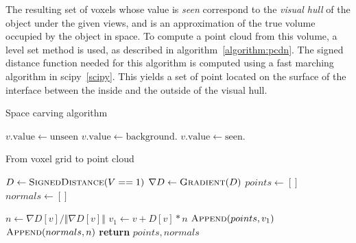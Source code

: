 The resulting set of voxels whose value is \emph{seen} correspond to the
\emph{visual hull} of the object under the given views, and is an approximation
of the true volume occupied by the object in space. To compute a point cloud
from this volume, a level set method is used, as described in
algorithm~\ref{algorithm:pcdn}. The signed distance function needed for this algorithm is computed using a
fast marching algorithm in scipy~\ref{scipy}. This yields a set of point located on the  
surface of the interface between the inside and the outside of the visual hull.

\begin{algorithm}
    \caption{Space carving algorithm}
    \label{algorithm:sc}
    \begin{algorithmic}[1]


            $v.\textrm{value} \gets \textrm{unseen}$
        \EndFor{}
                        $v.\textrm{value} \gets \textrm{background}.$
                        $v.\textrm{value} \gets \textrm{seen}.$
                    \EndIf{}
                \EndIf{}
            \EndFor{}
        \EndFor{}
        \EndFunction
    \end{algorithmic}
\end{algorithm}

\begin{algorithm}
    \caption{From voxel grid to point cloud}
    \label{algorithm:pcdn}
    \begin{algorithmic}[1]
        \State $D \gets \Call{SignedDistance}{V == 1}$
        \State $\nabla D \gets \Call{Gradient}{D}$
        \State $points \gets []$
        \State $normals \gets []$

            \State $n \gets \nabla D [v] / \Vert \nabla D [v] \Vert$
            \State $v_1 \gets v + D[v] * n$
            \State $\Call{Append}{points, v_1}$
            \State $\Call{Append}{normals, n}$
        \EndFor{}
        \State \textbf{return} $points, normals$
        \EndFunction
    \end{algorithmic}
\end{algorithm}

